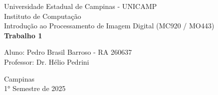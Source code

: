 \begin{titlepage} %
    \begin{center} %
    {\large Universidade Estadual de Campinas - UNICAMP}\\[0.2cm] %
    {\large Instituto de Computação}\\[0.2cm] %
    {\large Introdução ao Processamento de Imagem Digital (MC920 / MO443)}\\[5.1cm]
    {\bf \huge Trabalho 1}\\[5.1cm] %
    \end{center} %
    {\large Aluno: Pedro Brasil Barroso - RA 260637}\\[0.7cm] %
    {\large Professor: Dr. Hélio Pedrini}\\[5.1cm]
    \begin{center}
    {\large Campinas}\\[0.2cm]
    {\large 1° Semestre de 2025}
    \end{center}
\end{titlepage} %